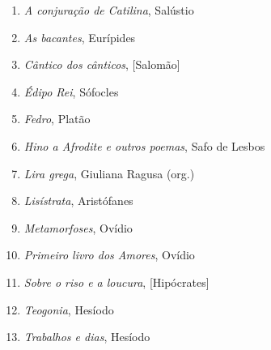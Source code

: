 \begin{enumerate}
\setlength{\topsep}{2pt}
\setlength{\partopsep}{0pt}
\setlength\parskip{4.2pt}
\setlength\itemsep{-1.4mm}
\item \textit{A conjuração de Catilina}, Salústio
\item \textit{As bacantes}, Eurípides
\item \textit{Cântico dos cânticos}, [Salomão]
\item \textit{Édipo Rei}, Sófocles
\item \textit{Fedro}, Platão
\item \textit{Hino a Afrodite e outros poemas}, Safo de Lesbos 
\item \textit{Lira grega}, Giuliana Ragusa (org.)
\item \textit{Lisístrata}, Aristófanes
\item \textit{Metamorfoses}, Ovídio
\item \textit{Primeiro livro dos Amores}, Ovídio
\item \textit{Sobre o riso e a loucura}, [Hipócrates]
\item \textit{Teogonia}, Hesíodo
\item \textit{Trabalhos e dias}, Hesíodo
\end{enumerate}






